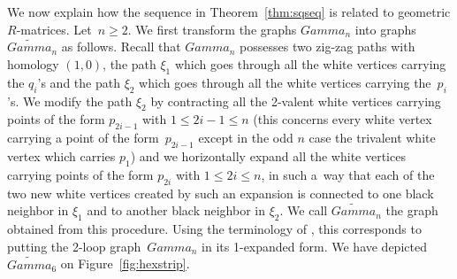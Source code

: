\documentclass[10pt,a4paper]{amsart}
\numberwithin{equation}{section}
\def\Gamma{Gamma}
\begin{document}
	
	We now explain how the sequence in Theorem~\ref{thm:sqseq} is related to geometric $R$-matrices. Let~${n\geq2}$. We first transform the graphs $\Gamma_n$ into graphs $\widetilde{\Gamma}_n$ as follows. Recall that $\Gamma_n$ possesses two zig-zag paths with homology $(1,0)$, the path $\xi_1$ which goes through all the white vertices carrying the $q_i$'s and the path $\xi_2$ which goes through all the white vertices carrying the~$p_i$'s. We modify the path $\xi_2$ by contracting all the 2-valent white vertices carrying points of the form $p_{2i-1}$ with $1\leq 2i-1\leq n$ (this concerns every white vertex carrying a point of the form~$p_{2i-1}$ except in the odd $n$ case the trivalent white vertex which carries $p_1$) and we horizontally expand all the white vertices carrying points of the form $p_{2i}$ with $1\leq 2i\leq n$, in such a~way that each of the two new white vertices created by such an expansion is connected to one black neighbor in $\xi_1$ and to another black neighbor in $\xi_2$. We call $\widetilde{\Gamma}_n$ the graph obtained from this procedure. Using the terminology of \cite{Chepuri}, this corresponds to putting the 2-loop graph~$\Gamma_n$ in its 1-expanded form. We have depicted $\widetilde{\Gamma}_6$ on Figure~\ref{fig:hexstrip}.
	
\end{document}
